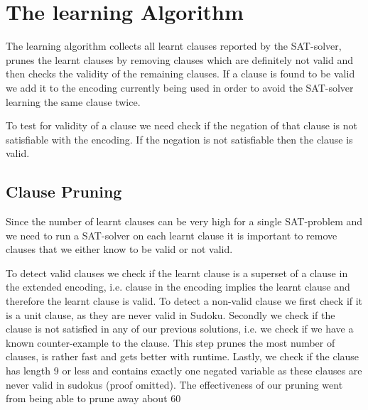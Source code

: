 \documentclass{article}
\begin{document}



\section{The learning Algorithm} \label{algorithm}
The learning algorithm collects all learnt clauses reported by the SAT-solver, prunes the learnt clauses by removing clauses which are definitely not valid and then checks the validity of the remaining clauses. If a clause is found to be valid we add it to the encoding currently being used in order to avoid the SAT-solver learning the same clause twice.

To test for validity of a clause we need check if the negation of that clause is not satisfiable with the encoding. If the negation is not satisfiable then the clause is valid.

\subsection{Clause Pruning} \label{clause pruning}
Since the number of learnt clauses can be very high for a single SAT-problem and we need to run a SAT-solver on each learnt clause it is important to remove clauses that we either know to be valid or not valid.

To detect valid clauses we check if the learnt clause is a superset of a clause in the extended encoding, i.e. clause in the encoding implies the learnt clause and therefore the learnt clause is valid. To detect a non-valid clause we first check if it is a unit clause, as they are never valid in Sudoku. Secondly we check if the clause is not satisfied in any of our previous solutions, i.e. we check if we have a known counter-example to the clause. This step prunes the most number of clauses, is rather fast and gets better with runtime. Lastly, we check if the clause has length 9 or less and contains exactly one negated variable as these clauses are never valid in sudokus (proof omitted). The effectiveness of our pruning went from being able to prune away about 60%
\end{document}
